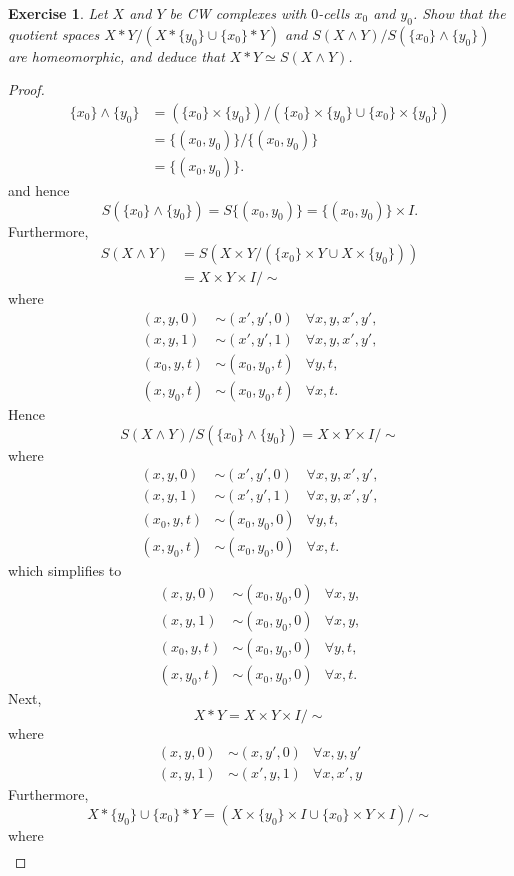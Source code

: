 \documentclass{article}
\newtheorem{exercise}{Exercise}[subsection]
\begin{document}
\begin{exercise}
Let $X$ and $Y$ be CW complexes with $0$-cells $x_0$ and $y_0$. Show that the quotient spaces $X*Y/(X*\{y_0\}\cup\{x_0\}*Y)$ and $S(X\wedge Y)/S(\{x_0\}\wedge\{y_0\})$ are homeomorphic, and deduce that $X*Y\simeq S(X\wedge Y)$.
\end{exercise}
\begin{proof}
\begin{align*}\{x_0\}\wedge\{y_0\}&=(\{x_0\}\times\{y_0\})/(\{x_0\}\times\{y_0\}\cup\{x_0\}\times\{y_0\})\\&=\{(x_0,y_0)\}/\{(x_0,y_0)\}\\&=\{(x_0,y_0)\}.\end{align*}and hence\[S(\{x_0\}\wedge\{y_0\})=S\{(x_0,y_0)\}=\{(x_0,y_0)\}\times I.\]
Furthermore,
\begin{align*}
S(X\wedge Y)&=S(X\times Y/(\{x_0\}\times Y\cup X\times\{y_0\}))\\&=X\times Y\times I/\sim
\end{align*}where \begin{align*}(x,y,0)&\sim(x',y',0)&\forall x,y,x',y',\\ (x,y,1)&\sim(x',y',1)&\forall x,y,x',y',\\(x_0,y,t)&\sim(x_0,y_0,t)&\forall y,t,\\ (x,y_0,t)&\sim(x_0,y_0,t)&\forall x,t.\end{align*} Hence \[S(X\wedge Y)/S(\{x_0\}\wedge\{y_0\})=X\times Y\times I/\sim\]where\begin{align*}(x,y,0)&\sim(x',y',0)&\forall x,y,x',y',\\ (x,y,1)&\sim(x',y',1)&\forall x,y,x',y',\\(x_0,y,t)&\sim(x_0,y_0,0)&\forall y,t,\\ (x,y_0,t)&\sim(x_0,y_0,0)&\forall x,t.\end{align*} which simplifies to \begin{align*}(x,y,0)&\sim(x_0,y_0,0)&\forall x,y,\\ (x,y,1)&\sim(x_0,y_0,0)&\forall x,y,\\(x_0,y,t)&\sim(x_0,y_0,0)&\forall y,t,\\ (x,y_0,t)&\sim(x_0,y_0,0)&\forall x,t.\end{align*}Next,
\[X*Y=X\times Y\times I/\sim\] where \begin{align*}
(x,y,0)&\sim(x,y',0)&\forall x,y,y'\\(x,y,1)&\sim(x',y,1)&\forall x,x',y
\end{align*}Furthermore, \[X*\{y_0\}\cup \{x_0\}*Y=(X\times\{y_0\}\times I\cup \{x_0\}\times Y\times I)/\sim\]where\begin{align*}

\end{align*}
\end{proof}
\end{document}
